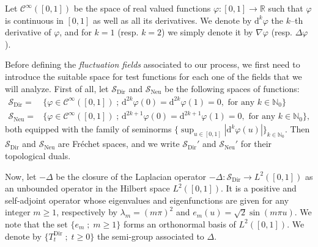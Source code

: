 \documentclass[10pt]{amsart}
\theoremstyle{definition}\newtheorem{defi}[theo]{Definition}\newtheorem{rema}[theo]{Remark}\newtheorem{exam}[theo]{Example}\newtheorem{exem}[theo]{Example}\newtheorem{nota}[theo]{Notation}
\DeclareMathOperator{\Dir}{Dir}
\DeclareMathOperator{\Neu}{Neu}
\newcommand{\bb}[1]{{\mathbb #1}}
\newcommand{\mc}[1]{{\mathcal #1}}
\renewcommand{\mc}[1]{{\mathcal #1}}
\newcommand{\SD}{\ensuremath{\mc S_{\Dir}}}
\renewcommand{\geq}{\geqslant}
\renewcommand{\ge}{\geqslant}
\newcommand*{\dd}{\mathrm{d}}
\begin{document}
Let $\mc C^\infty ([0, 1])$ be the space of real valued functions $\varphi : [0, 1] \to \bb R$ such that $\varphi$ is continuous in $[0,1]$ as well as all its derivatives. We denote by $\dd^{k}\varphi$ the $k$--th derivative of $\varphi$, and for $k=1$ (resp. $k=2$) we simply denote it by $\nabla\varphi$ (resp. $\Delta\varphi$).

Before defining the \emph{fluctuation fields} associated to our process, we first need to introduce the suitable space for test functions for each one of the fields that we will analyze. First of all, let $\mc S_{\Dir}$ and $\mc S_{\Neu}$ be the following spaces of functions:
\begin{align}
\mc S_{\Dir} =&\Big\{ \varphi \in \mc C^\infty ([0, 1]) \; ; \,\dd^{2k}\varphi (0) =\dd^{2k} \varphi (1) = 0, \text{ for any }k\in\mathbb{N}_0\Big\} \label{eq:space_test_funcDir}
\\
\mc S_{\Neu} =& \Big\{\varphi \in \mc C^\infty([0,1]) \; ; \,\dd^{2k+1} \varphi(0) =\dd^{2k+1} \varphi(1) = 0, \text{ for any } k\in\mathbb{N}_0 \Big\},\label{eq:space_test_funcNeu}
\end{align}
both equipped with the family of seminorms $\{\sup_{u \in [0,1]} |\dd^k \varphi(u)|\}_{k \in \bb N_0}$. Then $\SD$ and $ \mc S_{\Neu}$ are Fr\'echet spaces, and we write $\SD'$ and $ \mc S_{\Neu}'$ for their topological duals.

Now, let $-\Delta$ be the closure of the Laplacian operator $-\Delta \colon {\mc S_{\Dir}} \to L^2([0,1]) $ as an unbounded operator in the Hilbert space $L^2([0,1])$. It is a positive and self-adjoint operator whose eigenvalues and eigenfunctions are given for any integer $m\geq 1$, respectively by $\lambda_m=(m\pi)^2$ and $e_m(u)=\sqrt{2}\sin(m\pi u)$. We note that the set $\{e_m\; ; \;m\ge 1\}$ forms an orthonormal basis of $L^2([0,1])$. We denote by $\{ T_t^{\Dir} \; ; \; t \ge 0\}$ the semi-group associated to $\Delta$.
\end{document}
